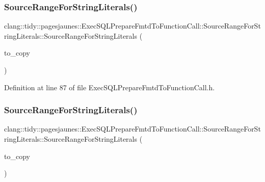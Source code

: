 \subsubsection{\texorpdfstring{Source\+Range\+For\+String\+Literals()}{SourceRangeForStringLiterals()}\hspace{0.1cm}{\footnotesize\ttfamily [3/6]}}
{\footnotesize\ttfamily clang\+::tidy\+::pagesjaunes\+::\+Exec\+S\+Q\+L\+Prepare\+Fmtd\+To\+Function\+Call\+::\+Source\+Range\+For\+String\+Literals\+::\+Source\+Range\+For\+String\+Literals (\begin{DoxyParamCaption}\item[{\hyperlink{classclang_1_1tidy_1_1pagesjaunes_1_1_exec_s_q_l_prepare_fmtd_to_function_call_1_1_source_range_for_string_literals}{Source\+Range\+For\+String\+Literals} \&}]{to\+\_\+copy }\end{DoxyParamCaption})\hspace{0.3cm}{\ttfamily [inline]}}



Definition at line 87 of file Exec\+S\+Q\+L\+Prepare\+Fmtd\+To\+Function\+Call.\+h.

\mbox{\label{classclang_1_1tidy_1_1pagesjaunes_1_1_exec_s_q_l_prepare_fmtd_to_function_call_1_1_source_range_for_string_literals_a774bdf8bf1ca2b8da8deb9b36f704979}} 
\subsubsection{\texorpdfstring{Source\+Range\+For\+String\+Literals()}{SourceRangeForStringLiterals()}\hspace{0.1cm}{\footnotesize\ttfamily [4/6]}}
{\footnotesize\ttfamily clang\+::tidy\+::pagesjaunes\+::\+Exec\+S\+Q\+L\+Prepare\+Fmtd\+To\+Function\+Call\+::\+Source\+Range\+For\+String\+Literals\+::\+Source\+Range\+For\+String\+Literals (\begin{DoxyParamCaption}\item[{\hyperlink{classclang_1_1tidy_1_1pagesjaunes_1_1_exec_s_q_l_prepare_fmtd_to_function_call_1_1_source_range_for_string_literals}{Source\+Range\+For\+String\+Literals} const \&}]{to\+\_\+copy }\end{DoxyParamCaption})\hspace{0.3cm}{\ttfamily [inline]}}



